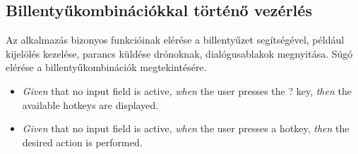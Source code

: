 \subsection{Billentyűkombinációkkal történő vezérlés}

Az alkalmazás bizonyos funkcióinak elérése a billentyűzet segítségével, például kijelölés kezelése, parancs küldése drónoknak, dialógusablakok megnyitása.
Súgó elérése a billentyűkombinációk megtekintésére.

\begin {itemize}
  \item \textit{Given} that no input field is active, \textit{when} the user presses the ? key, \textit{then} the available hotkeys are displayed.
  \item \textit{Given} that no input field is active, \textit{when} the user presses a hotkey, \textit{then} the desired action is performed.
\end {itemize}